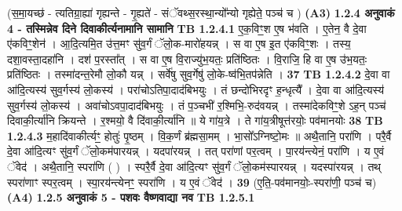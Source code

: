 \documentclass[17pt]{extarticle}
\begin{document}
                  \newline
                                    (स॒मा॒यच्छ॑ - त्यतिग्रा॒ह्या॑ गृह्यन्ते - गृ॒ह्यते॑ - संॅवथ्स॒रस्था॒न्यो᳚न्यो गृह्येते॒ पञ्च॑ च ) \textbf{(A3)} \newline \newline
                \textbf{ 1.2.4      अनुवाकं   4 - तस्मिन्नेव दिने दिवाकीर्त्यनामानि सामानि} \newline
                                \textbf{ TB 1.2.4.1} \newline
                  ए॒क॒विꣳ॒॒श ए॒ष भ॑वति । ए॒तेन॒ वै दे॒वा ए॑कविꣳ॒॒शेन॑ । आ॒दि॒त्यमि॒त उ॑त्त॒मꣳ सु॑व॒र्गं ॅलो॒क-मारो॑हयन्न् । स वा ए॒ष इ॒त ए॑कविꣳ॒॒शः । तस्य॒ दशा॒वस्ता॒दहा॑नि । दश॑ प॒रस्ता᳚त् । स वा ए॒ष वि॒राज्यु॑भ॒यतः॒ प्रति॑ष्ठितः । वि॒राजि॒ हि वा ए॒ष उ॑भ॒यतः॒ प्रति॑ष्ठितः । तस्मा॑दन्त॒रेमौ लो॒कौ यन्न् । सर्वे॑षु सुव॒र्गेषु॑ लो॒के-ष्व॑भि॒तप॑न्नेति । \textbf{ 37} \newline
                  \newline
                                \textbf{ TB 1.2.4.2} \newline
                  दे॒वा वा आ॑दि॒त्यस्य॑ सुव॒र्गस्य॑ लो॒कस्य॑ । परा॑चोऽतिपा॒दाद॑बिभयुः । तं छन्दो॑भिरदृꣳ ह॒न्धृत्यै᳚ । दे॒वा वा आ॑दि॒त्यस्य॑ सुव॒र्गस्य॑ लो॒कस्य॑ । अवा॑चोऽवपा॒दाद॑बिभयुः । तं प॒ञ्चभी॑ र॒श्मिभि॒-रुद॑वयन्न् । तस्मा॑देकविꣳ॒॒शे ऽह॒न् पञ्च॑ दिवाकी॒र्त्या॑नि क्रियन्ते । र॒श्मयो॒ वै दि॑वाकी॒र्त्या॑नि ॥ ये गा॑य॒त्रे । ते गा॑य॒त्रीषूत्त॑रयोः॒ पव॑मानयोः \textbf{ 38} \newline
                  \newline
                                \textbf{ TB 1.2.4.3} \newline
                  म॒हादि॑वाकीर्त्यꣳ॒॒ होतुः॑ पृ॒ष्ठम् । वि॒क॒र्णं ब्र॑ह्मसा॒मम् । भा॒सो᳚ऽग्निष्टो॒मः ॥ अथै॒तानि॒ परा॑णि । परै॒र्वै दे॒वा आ॑दि॒त्यꣳ सु॑व॒र्गं ॅलो॒कम॑पारयन्न् । यदपा॑रयन्न् । तत् परा॑णां पर॒त्वम् । पा॒रय॑न्त्येनं॒ परा॑णि । य ए॒वं ॅवेद॑ । अथै॒तानि॒ स्परा॑णि ( ) । स्परै॒र्वै दे॒वा आ॑दि॒त्यꣳ सु॑व॒र्गं ॅलो॒कम॑स्पारयन्न् । यदस्पा॑रयन्न् । तथ् स्परा॑णाꣳ स्पर॒त्वम् । स्पा॒रय॑न्त्येनꣳ॒॒ स्परा॑णि । य ए॒वं ॅवेद॑ । \textbf{ 39} \newline
                  \newline
                                    (ए॒ति॒-पव॑मानयोः॒-स्परा॑णी॒ पञ्च॑ च) \textbf{(A4)} \newline \newline
                \textbf{ 1.2.5      अनुवाकं   5 - पशवः वैष्णवाद्या नव} \newline
                                \textbf{ TB 1.2.5.1} \newline
\end{document}
